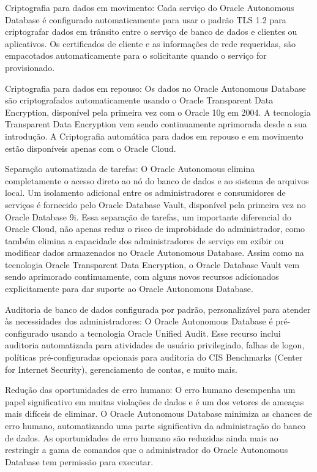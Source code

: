 \begin{alineas} 
\item Criptografia para dados em movimento:  Cada serviço do Oracle Autonomous Database é configurado automaticamente para usar o padrão TLS 1.2 para criptografar dados em trânsito entre o serviço de banco de dados e clientes ou aplicativos. Os certificados de cliente e as informações de rede requeridas, são empacotados automaticamente para o solicitante quando o serviço for provisionado.

\item Criptografia para dados em repouso: Os dados no Oracle Autonomous Database são criptografados automaticamente usando o Oracle Transparent Data Encryption, disponível pela primeira vez com o Oracle 10g em 2004. A tecnologia Transparent Data Encryption vem sendo continuamente aprimorada desde a sua introdução. A Criptografia automática para dados em repouso e em movimento estão disponíveis apenas com o Oracle Cloud.

\item Separação automatizada de tarefas: O Oracle Autonomous elimina completamente o acesso direto ao nó do banco de dados e ao sistema de arquivos local. Um isolamento adicional entre os administradores e consumidores de serviços é fornecido pelo Oracle Database Vault, disponível pela primeira vez no Oracle Database 9i. Essa separação de tarefas, um importante diferencial do Oracle Cloud, não apenas reduz o risco de improbidade do administrador, como também elimina a capacidade dos administradores de serviço em exibir ou modificar dados armazenados no Oracle Autonomous Database. Assim como na tecnologia Oracle Transparent Data Encryption, o Oracle Database Vault vem sendo  aprimorado continuamente, com alguns novos recursos adicionados explicitamente para dar suporte ao Oracle Autonomous Database.

\item Auditoria de banco de dados configurada por padrão, personalizável para atender às necessidades dos administradores: O Oracle Autonomous Database é pré-configurado usando a tecnologia Oracle Unified Audit. Esse recurso inclui auditoria automatizada para atividades de usuário privilegiado, falhas de logon, políticas pré-configuradas opcionais para auditoria do CIS Benchmarks (Center for Internet Security), gerenciamento de contas, e muito mais.

\item Redução das oportunidades de erro humano: O erro humano desempenha um papel significativo em muitas violações de dados e é um dos vetores de ameaças mais difíceis de eliminar. O Oracle Autonomous Database minimiza as chances de erro humano, automatizando uma parte significativa da administração do banco de dados. As oportunidades de erro humano são reduzidas ainda mais ao restringir a gama de comandos que o administrador do Oracle Autonomous Database tem permissão para executar.


\end{alineas}
